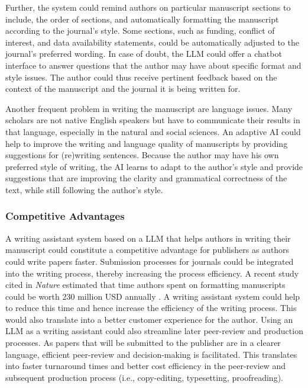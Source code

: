 Further, the system could remind authors
on particular manuscript sections to include, the order of sections, and automatically formatting the manuscript according to the journal's
style. Some sections, such as funding, conflict of interest, and data availability statements, could be automatically adjusted to the journal's 
preferred wording. In case of doubt, the LLM could offer a chatbot interface to answer questions that the author may have about specific format
and style issues. The author could thus receive pertinent feedback based on the context of the manuscript and the journal it is being 
written for.

Another frequent problem in writing the manuscript are language issues. Many scholars are not native English speakers but have to
communicate their results in that language, especially in the natural and social sciences. An adaptive AI could help to improve the
writing and language quality of manuscripts by providing suggestions for (re)writing sentences. Because the author may have his own
preferred style of writing, the AI learns to adapt to the author's style and provide suggestions that are improving the clarity and
grammatical correctness of the text, while still following the author's style. 

\subsubsection*{Competitive Advantages} 
A writing assistant system based on a LLM that helps authors in writing their manuscript could constitute a competitive advantage for 
publishers as authors could write papers faster. Submission processes for journals could be integrated into the writing process, thereby
increasing the process efficiency. A recent study cited in \textit{Nature} estimated that time authors spent on formatting manuscripts
could be worth 230 million USD annually \citep{kozlovRevealedMillionsDollars2023,clotworthySavingTimeMoney2023}. A writing assistant
system could help to reduce this time and hence increase the efficiency of the writing process. This would also translate into a better
customer experience for the author. Using an LLM as a writing assistant could also streamline later peer-review and production processes.
As papers that will be submitted to the  publisher are in a clearer language, efficient peer-review and decision-making is facilitated.
This translates into faster turnaround times and better cost efficiency in the peer-review and subsequent production process (i.e.,
copy-editing, typesetting, proofreading).


